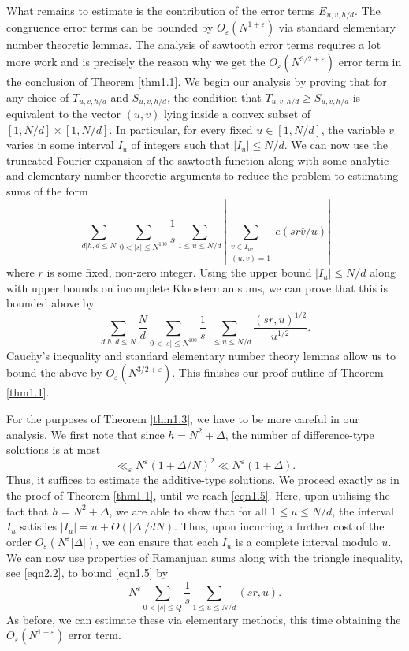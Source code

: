\documentclass[12pt,reqno]{amsart}
\theoremstyle{definition}
\theoremstyle{remark}
\numberwithin{equation}{section}
\renewcommand{\geq}{\geqslant}
\renewcommand{\leq}{\leqslant}
\def\eps{\varepsilon}
\newcommand\1{\mathds{1}}
\begin{document}
What remains to estimate is the contribution of the error terms $E_{u,v,h/d}$. The congruence error terms can be bounded by $O_{\eps}(N^{1 + \eps})$ via standard elementary number theoretic lemmas. The analysis of sawtooth error terms requires a lot more work and is precisely the reason why we get the $O_{\eps}(N^{3/2 + \eps})$ error term in the conclusion of Theorem \ref{thm1.1}. We begin our analysis by proving that for any choice of $T_{u,v,h/d}$ and $S_{u,v,h/d}$, the condition that $T_{u,v,h/d} \geq S_{u,v,h/d}$ is equivalent to the vector $(u,v)$ lying inside a convex subset of $[1,N/d]\times[1,N/d]$. In particular, for every fixed $u \in [1,N/d]$, the variable $v$ varies in some interval $I_u$ of integers such that $|I_u| \leq N/d$. We can now use the truncated Fourier expansion of the sawtooth function along with some analytic and elementary number theoretic arguments to reduce the problem to estimating sums of the form
\begin{equation} \label{eqn1.5}
 \sum_{d|h, d \leq N} \sum_{0 < |s| \leq N^{100}} \frac{1}{s}  \sum_{1 \leq u \leq N/d} | \sum_{\substack{v \in I_u,  \\ (u,v) = 1}} e(s r \overline{v}/u)| 
\end{equation}
where $r$ is some fixed, non-zero integer. Using the upper bound $|I_u| \leq N/d$ along with upper bounds on incomplete Kloosterman sums, we can prove that this is bounded above by 
\begin{equation*}
 \sum_{d|h, d \leq N} \frac{N}{d}\sum_{0 < |s| \leq N^{100}} \frac{1}{s} \sum_{1 \leq u \leq N/d} \frac{(sr, u)^{1/2}}{u^{1/2}}.
 \end{equation*} 
Cauchy's inequality and standard elementary number theory lemmas allow us to bound the above by $O_{\eps}(N^{3/2 + \eps})$. This finishes our proof outline of Theorem \ref{thm1.1}.

For the purposes of Theorem \ref{thm1.3}, we have to be more careful in our analysis. We first note that since $h = N^2 + \Delta$, the number of difference-type solutions is at most 
\[ \ll_{\eps} N^{\eps} ( 1+ \Delta/N)^2 \ll N^{\eps}  (1 + \Delta).\]
Thus, it suffices to estimate the additive-type solutions. We proceed exactly as in the proof of Theorem \ref{thm1.1}, until we reach \eqref{eqn1.5}. Here, upon utilising the fact that $h = N^2 + \Delta$, we are able to show that for all $1 \leq u \leq N/d$, the interval $I_u$ satisfies $|I_u| = u + O( |\Delta|/dN)$. Thus, upon incurring a further cost of the order $O_{\eps}(N^{\eps}|\Delta|)$, we can ensure that each $I_u$ is a complete interval modulo $u$. We can now use  properties of Ramanjuan sums along with the triangle inequality, see \eqref{eqn2.2},  to bound \eqref{eqn1.5}  by
\[ N^{\eps} \sum_{0 < |s| \leq Q} \frac{1}{s} \sum_{1 \leq u \leq N/d} (sr,u) . \]
 As before, we can estimate these via elementary methods, this time obtaining the $O_{\eps}(N^{1 + \eps})$ error term.
\end{document}
